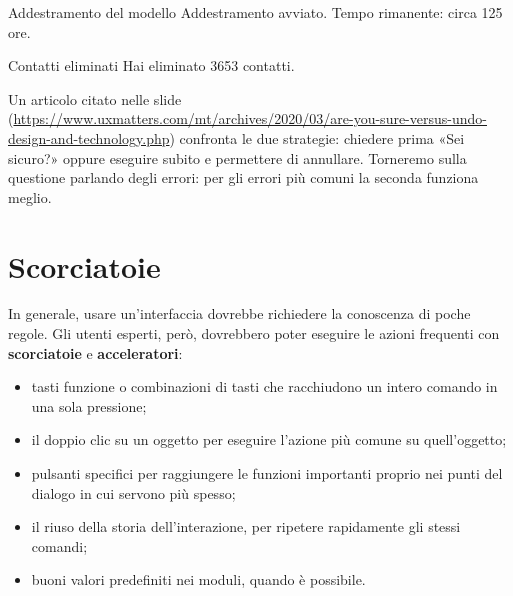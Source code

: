 \begin{center}
\begin{minipage}[t]{0.42\linewidth}\centering
  \begin{finestra}{Addestramento del modello}
    Addestramento avviato. Tempo rimanente: circa 125 ore.\par\smallskip
  \end{finestra}
\end{minipage}\hspace{0.06\linewidth}%
\begin{minipage}[t]{0.36\linewidth}\centering
  \begin{finestra}{Contatti eliminati}
    Hai eliminato 3653 contatti.
  \end{finestra}
\end{minipage}
\end{center}

Un articolo citato nelle slide (\url{https://www.uxmatters.com/mt/archives/2020/03/are-you-sure-versus-undo-design-and-technology.php})
confronta le due strategie: chiedere prima «Sei sicuro?» oppure eseguire subito e permettere di annullare. Torneremo
sulla questione parlando degli errori: per gli errori più comuni la seconda funziona meglio.

\section{Scorciatoie}

In generale, usare un'interfaccia dovrebbe richiedere la conoscenza di poche regole. Gli utenti esperti, però,
dovrebbero poter eseguire le azioni frequenti con \textbf{scorciatoie} e \textbf{acceleratori}:

\begin{itemize}
  \item tasti funzione o combinazioni di tasti che racchiudono un intero comando in una sola pressione;
  \item il doppio clic su un oggetto per eseguire l'azione più comune su quell'oggetto;
  \item pulsanti specifici per raggiungere le funzioni importanti proprio nei punti del dialogo in cui servono più
        spesso;
  \item il riuso della storia dell'interazione, per ripetere rapidamente gli stessi comandi;
  \item buoni valori predefiniti nei moduli, quando è possibile.
\end{itemize}

